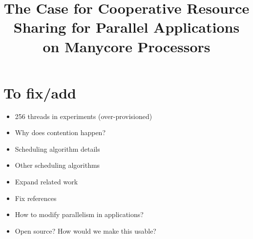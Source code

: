 \documentclass[10pt]{sigplanconf}
\begin{document}
\title{The Case for Cooperative Resource Sharing for Parallel Applications on Manycore Processors}
\maketitle

\section*{To fix/add}
\begin{itemize}
    \item 256 threads in experiments (over-provisioned)
    \item Why does contention happen?
    \item Scheduling algorithm details
    \item Other scheduling algorithms
    \item Expand related work
    \item Fix references
    \item How to modify parallelism in applications?
    \item Open source? How would we make this usable?
\end{itemize}



% 









\end{document}
